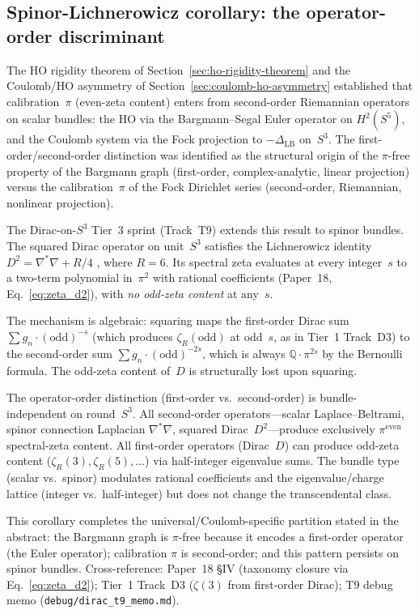
\subsection{Spinor-Lichnerowicz corollary: the operator-order discriminant}
\label{sec:spinor-lichnerowicz}

The HO rigidity theorem of Section~\ref{sec:ho-rigidity-theorem}
and the Coulomb/HO asymmetry of Section~\ref{sec:coulomb-ho-asymmetry}
established that calibration~$\pi$ (even-zeta content) enters from
second-order Riemannian operators on scalar bundles: the HO via
the Bargmann--Segal Euler operator on $H^2(S^5)$, and the Coulomb
system via the Fock projection to $-\Delta_{\mathrm{LB}}$ on~$S^3$.
The first-order/second-order distinction was identified as the
structural origin of the $\pi$-free property of the Bargmann graph
(first-order, complex-analytic, linear projection) versus the
calibration~$\pi$ of the Fock Dirichlet series (second-order,
Riemannian, nonlinear projection).

The Dirac-on-$S^3$ Tier~3 sprint (Track~T9) extends this result to
spinor bundles.  The squared Dirac operator on unit~$S^3$ satisfies
the Lichnerowicz identity $D^2 = \nabla^*\nabla + R/4$
\cite{lichnerowicz1963}, where $R = 6$.  Its spectral zeta evaluates
at every integer~$s$ to a two-term polynomial in~$\pi^2$ with
rational coefficients (Paper~18, Eq.~\ref{eq:zeta_d2}), with
\emph{no odd-zeta content} at any~$s$.

The mechanism is algebraic: squaring maps the first-order Dirac
sum $\sum g_n \cdot (\text{odd})^{-s}$ (which produces
$\zeta_R(\text{odd})$ at odd~$s$, as in Tier~1 Track~D3) to the
second-order sum $\sum g_n \cdot (\text{odd})^{-2s}$, which is always
$\mathbb{Q} \cdot \pi^{2s}$ by the Bernoulli formula.  The
odd-zeta content of~$D$ is structurally lost upon squaring.

\begin{corollary}
The operator-order distinction (first-order vs.\ second-order) is
bundle-independent on round~$S^3$.  All second-order operators---scalar
Laplace--Beltrami, spinor connection Laplacian $\nabla^*\nabla$,
squared Dirac~$D^2$---produce exclusively $\pi^{\mathrm{even}}$
spectral-zeta content.  All first-order operators (Dirac~$D$) can
produce odd-zeta content ($\zeta_R(3), \zeta_R(5), \ldots$) via
half-integer eigenvalue sums.  The bundle type (scalar vs.\ spinor)
modulates rational coefficients and the eigenvalue/charge lattice
(integer vs.\ half-integer) but does not change the transcendental
class.
\end{corollary}

This corollary completes the universal/Coulomb-specific partition
stated in the abstract: the Bargmann graph is $\pi$-free because
it encodes a first-order operator (the Euler operator); calibration
$\pi$ is second-order; and this pattern persists on spinor bundles.
Cross-reference: Paper~18 \S IV (taxonomy closure via
Eq.~\ref{eq:zeta_d2}); Tier~1 Track~D3 ($\zeta(3)$ from
first-order Dirac); T9 debug memo
(\texttt{debug/dirac\_t9\_memo.md}).
